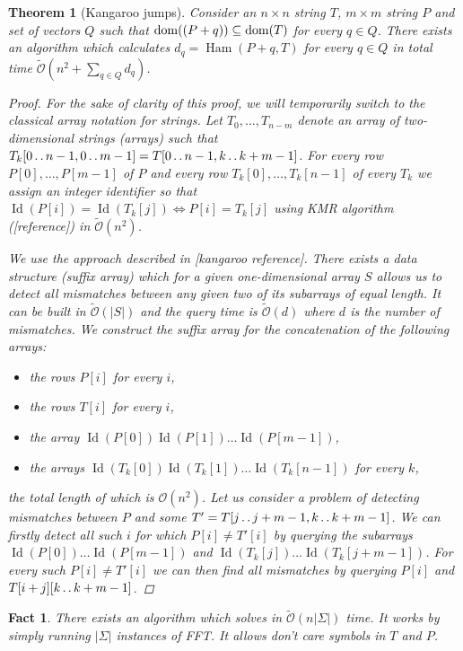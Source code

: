 \documentclass[11pt]{article}
\DeclareMathOperator*{\Ham}{Ham}
\DeclareMathOperator*{\ID}{Id}
\def\dd{\mathinner{.\,.}}
\renewcommand{\O}{\mathcal{O}}
\newcommand{\tO}{\tilde{\mathcal{O}}}
\theoremstyle{plain}
\newtheorem{theorem}{Theorem}
\newtheorem{fact}{Fact}
\theoremstyle{definition}
\theoremstyle{remark}
\begin{document}
\begin{theorem}[Kangaroo jumps]\label{kangaroos}
	Consider an $n \times n$ string $T$, $m \times m$ string $P$ and set of vectors $Q$ such that $\operatorname*{dom}((P + q)) \subseteq \operatorname*{dom}(T)$ for every $q \in Q$.
	There exists an algorithm which calculates $ d_q = \Ham(P + q, T) $ for every $q \in Q$ in total time $\tO(n^2 + \sum_{q \in Q} d_q)$.
	\begin{proof}
		For the sake of clarity of this proof, we will temporarily switch to the classical array notation for strings.
		Let $T_0, \dots, T_{n - m}$ denote an array of two-dimensional strings (arrays) such that $T_k[0 \dd n - 1, 0 \dd m - 1] = T[0 \dd n - 1, k \dd k + m - 1]$.
		For every row $P[0], \dots, P[m - 1]$ of $P$ and every row $T_k[0], \dots, T_k[n - 1]$ of every $T_k$ we assign an integer identifier so that $\ID(P[i]) = \ID(T_k[j]) \Leftrightarrow P[i] = T_k[j]$ using KMR algorithm ([reference]) in $\tO(n^2)$.
		
		We use the approach described in [kangaroo reference].
		There exists a data structure (suffix array) which for a given one-dimensional array $S$ allows us to detect all mismatches between any given two of its subarrays of equal length.
		It can be built in $\tO(|S|)$ and the query time is $\tO(d)$ where $d$ is the number of mismatches.
		We construct the suffix array for the concatenation of the following arrays:
		\begin{itemize}
			\item the rows $P[i]$ for every $i$,
			\item the rows $T[i]$ for every $i$,
			\item the array $\ID(P[0]) \ID(P[1]) \dots \ID(P[m - 1])$,
			\item the arrays $\ID(T_k[0]) \ID(T_k[1]) \dots \ID(T_k[n - 1])$ for every $k$,
		\end{itemize}
		the total length of which is $\O(n^2)$.
		Let us consider a problem of detecting mismatches between $P$ and some $T' = T[j \dd j + m - 1, k \dd k + m - 1]$.
		We can firstly detect all such $i$ for which $P[i] \neq T'[i]$ by querying the subarrays $\ID(P[0]) \dots \ID(P[m - 1])$ and $\ID(T_k[j]) \dots \ID(T_k[j + m - 1])$.
		For every such $P[i] \neq T'[i]$ we can then find all mismatches by querying $P[i]$ and $T[i + j][k \dd k + m - 1]$.
	\end{proof}
\end{theorem}


\begin{fact}\label{sigman1d}
	There exists an algorithm which solves \hd in $\tO(n|\Sigma|)$ time.
	It works by simply running $|\Sigma|$ instances of FFT.
	It allows don't care symbols in $T$ and $P$.
\end{fact}
\end{document}
